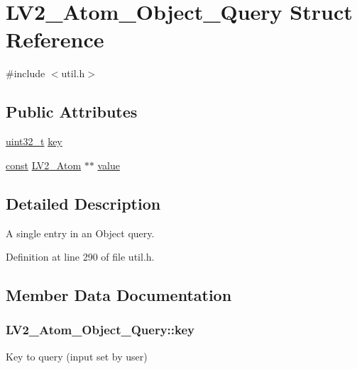 \hypertarget{struct_l_v2___atom___object___query}{}\section{L\+V2\+\_\+\+Atom\+\_\+\+Object\+\_\+\+Query Struct Reference}
\label{struct_l_v2___atom___object___query}


{\ttfamily \#include $<$util.\+h$>$}

\subsection*{Public Attributes}
\begin{DoxyCompactItemize}
\item 
\hyperlink{lib-src_2ffmpeg_2win32_2stdint_8h_a6eb1e68cc391dd753bc8ce896dbb8315}{uint32\+\_\+t} \hyperlink{struct_l_v2___atom___object___query_a3be0152ec09bb2bd106d6bfe561347d1}{key}
\item 
\hyperlink{getopt1_8c_a2c212835823e3c54a8ab6d95c652660e}{const} \hyperlink{struct_l_v2___atom}{L\+V2\+\_\+\+Atom} $\ast$$\ast$ \hyperlink{struct_l_v2___atom___object___query_a0101d002fae056768c3fed36f1b564e0}{value}
\end{DoxyCompactItemize}


\subsection{Detailed Description}
A single entry in an Object query. 

Definition at line 290 of file util.\+h.



\subsection{Member Data Documentation}
\subsubsection[{\texorpdfstring{key}{key}}]{ L\+V2\+\_\+\+Atom\+\_\+\+Object\+\_\+\+Query\+::key}\hypertarget{struct_l_v2___atom___object___query_a3be0152ec09bb2bd106d6bfe561347d1}{}\label{struct_l_v2___atom___object___query_a3be0152ec09bb2bd106d6bfe561347d1}
Key to query (input set by user) 

